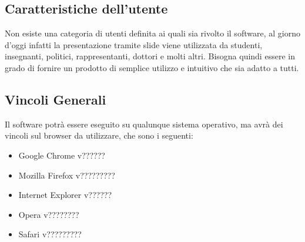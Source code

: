 \subsection{Caratteristiche dell'utente}
Non esiste una categoria di utenti definita ai quali sia rivolto il software, al giorno d'oggi infatti la presentazione tramite slide viene utilizzata da studenti, insegnanti, politici, rappresentanti, dottori e molti altri. Bisogna quindi essere in grado di fornire un prodotto di semplice utilizzo e intuitivo che sia adatto a tutti.

\subsection{Vincoli Generali}
Il software potrà essere eseguito su qualunque sistema operativo, ma avrà dei vincoli sul browser da utilizzare, che sono i seguenti:
\begin{itemize}
	\item Google Chrome v??????
	\item Mozilla Firefox v?????????
	\item Internet Explorer v??????
	\item Opera v????????
	\item Safari v?????????
\end{itemize}
